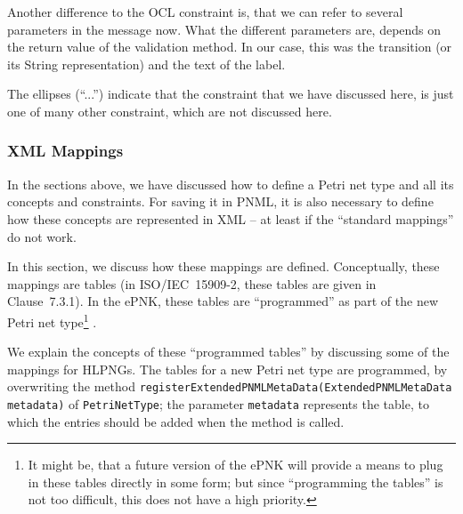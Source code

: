 Another difference to the OCL constraint is, that we can refer to several
parameters in the message now. What the different parameters are, depends
on the return value of the validation method. In our case, this was
the transition (or its String representation) and the text of the label.

The ellipses (``...'') indicate that the constraint that we have discussed
here, is just one of many other constraint, which are not discussed here.%

\subsubsection{XML Mappings}
\label{subsubsec:XMLmapping}

In the sections above, we have discussed how to define a Petri net type and
all its concepts and constraints. For saving it in PNML, it is also necessary
to define how these concepts are represented in XML -- at least if the
``standard mappings'' do not work.

In this section, we discuss how these mappings are defined. Conceptually,
these mappings are tables (in ISO/IEC~15909-2, these tables are given
in Clause~7.3.1). In the ePNK, these tables are ``programmed'' as part
of the new Petri net type\footnote
  {It might be, that a future version of the ePNK will provide a means to plug
  in these tables directly in some form; but since ``programming the tables'' is
   not too difficult, this does not have a high priority.}%
.  

We explain the concepts of these ``programmed tables'' by discussing some
of the mappings for HLPNGs. The tables for a new Petri net type are
programmed, by overwriting the method
{\tt registerExtended\optsep{}PNMLMetaData(\optsep{}ExtendedPNMLMetaData
metadata)} of {\tt PetriNetType}; the parameter {\tt meta\optsep{}data}
represents the table, to which the entries should be added when the method is called.

